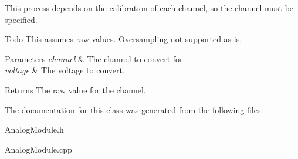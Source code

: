 This process depends on the calibration of each channel, so the channel must be specified.

\begin{Desc}
\item[\hyperlink{todo__todo000001}{Todo}]This assumes raw values. Oversampling not supported as is.\end{Desc}



\begin{DoxyParams}{Parameters}
{\em channel} & The channel to convert for. \\
\hline
{\em voltage} & The voltage to convert. \\
\hline
\end{DoxyParams}
\begin{DoxyReturn}{Returns}
The raw value for the channel. 
\end{DoxyReturn}


The documentation for this class was generated from the following files:\begin{DoxyCompactItemize}
\item 
AnalogModule.h\item 
AnalogModule.cpp\end{DoxyCompactItemize}

